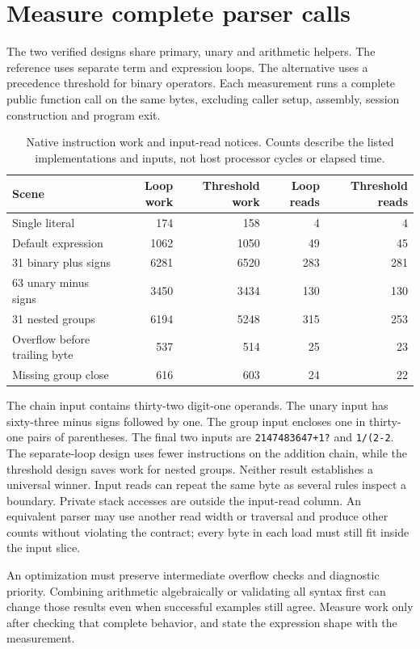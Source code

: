 \section{Measure complete parser calls}\label{expression-measurement}
The two verified designs share primary, unary and arithmetic helpers. The reference
uses separate term and expression loops. The alternative uses a precedence threshold
for binary operators. Each measurement runs a complete public function call on the
same bytes, excluding caller setup, assembly, session construction and program exit.

\begin{table}[htbp]
  \centering
  \caption{Native instruction work and input-read notices. Counts describe the listed implementations and inputs, not host processor cycles or elapsed time.}
  \begin{tabular}{lrrrr}
    \toprule
    Scene                         & Loop work & Threshold work & Loop reads & Threshold reads \\
    \midrule
    Single literal                & 174       & 158            & 4          & 4               \\
    Default expression            & 1062      & 1050           & 49         & 45              \\
    31 binary plus signs          & 6281      & 6520           & 283        & 281             \\
    63 unary minus signs          & 3450      & 3434           & 130        & 130             \\
    31 nested groups              & 6194      & 5248           & 315        & 253             \\
    Overflow before trailing byte & 537       & 514            & 25         & 23              \\
    Missing group close           & 616       & 603            & 24         & 22              \\
    \bottomrule
  \end{tabular}
\end{table}

The chain input contains thirty-two digit-one operands. The unary input has sixty-three
minus signs followed by one. The group input encloses one in thirty-one pairs of
parentheses. The final two inputs are \texttt{2147483647+1?} and \texttt{1/(2-2}.
The separate-loop design uses fewer instructions on the addition chain, while the
threshold design saves work for nested groups. Neither result establishes a universal
winner. Input reads can repeat the same byte as several rules inspect a boundary.
Private stack accesses are outside the input-read column. An equivalent parser may
use another read width or traversal and produce other counts without violating the
contract; every byte in each load must still fit inside the input slice.

An optimization must preserve intermediate overflow checks and diagnostic priority.
Combining arithmetic algebraically or validating all syntax first can change those
results even when successful examples still agree. Measure work only after checking
that complete behavior, and state the expression shape with the measurement.
